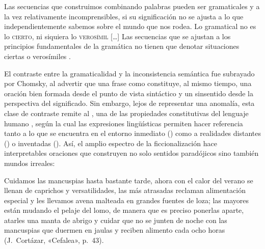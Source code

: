 \begin{cita}
Las secuencias que construimos combinando palabras pueden ser gramaticales y a
la vez relativamente incomprensibles, si su significación no se ajusta a lo que
independientemente sabemos sobre el mundo que nos rodea. Lo gramatical no es lo
\textsc{cierto}, ni siquiera lo \textsc{verosímil} [\ldots] Las secuencias que
se ajustan a los principios fundamentales de la gramática no tienen que denotar
situaciones ciertas o verosímiles \parencite[36]{bosque2009}.
\end{cita}

El contraste entre la gramaticalidad y la inconsistencia semántica fue
subrayado por Chomsky, al advertir que una frase como  constituye, al mismo tiempo, una oración bien
formada desde el punto de vista sintáctico y un sinsentido desde la perspectiva
del significado. Sin embargo, lejos de representar una anomalía, esta clase de
contraste remite al , una de las propiedades
constitutivas del lenguaje humano \parencite{hockett1971}, según la cual las
expresiones lingüísticas permiten hacer referencia tanto a lo que se encuentra
en el entorno inmediato () como a
realidades distantes () o
inventadas (). Así, el amplio
espectro de la ficcionalización hace interpretables oraciones que construyen no
solo sentidos paradójicos sino también mundos irreales:

\begin{cita}
Cuidamos las mancuspias hasta bastante tarde, ahora con el calor del verano se
llenan de caprichos y versatilidades, las más atrasadas reclaman alimentación
especial y les llevamos avena malteada en grandes fuentes de loza; las mayores
están mudando el pelaje del lomo, de manera que es preciso ponerlas aparte,
atarles una manta de abrigo y cuidar que no se junten de noche con las
mancuspias que duermen en jaulas y reciben alimento cada ocho horas
(J.~Cortázar, «Cefalea», p.~43).
\end{cita}


